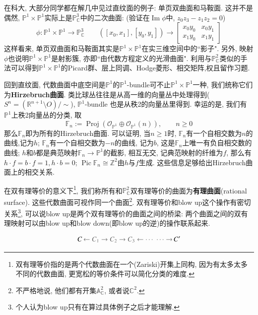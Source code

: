 \documentclass[UTF8,12pt,twoside]{article}
\theoremstyle{definition}
\newcommand{\RR}{\mathbb{R}}  %
\newcommand{\ZZ}{\mathbb{Z}}  %
\newcommand{\CC}{\mathbb{C}}  %
\newcommand{\PCC}{\mathbb{P}_{\CC}^2} %
\newcommand{\PPC}{\mathbb{P}^1 \times \mathbb{P}^1} %
\newcommand{\Img}{\operatorname{Im}}
\newcommand{\Proj}{\operatorname{Proj}}
\newcommand{\Pic}{\operatorname{Pic}}
\numberwithin{equation}{section}
\begin{document}
在科大, 大部分同学都在解几中见过直纹面的例子: 单页双曲面和马鞍面. 这并不是偶然, $\PPC$实际上是$\mathbb{P}_{\CC}^3$中的二次曲面: (验证在$\Img \phi$中, $z_0z_3-z_1z_2=0$)
$$\phi: \PPC \longrightarrow \mathbb{P}_{\CC}^3 \qquad ([x_0,x_1],[y_0,y_1]) \longrightarrow \begin{bmatrix}
x_0y_0 & x_0y_1 \\
x_1y_0 & x_1y_1
\end{bmatrix}$$
这样看来, 单页双曲面和马鞍面其实是$\PPC$在实三维空间中的``影子". 另外, 映射$\phi$也说明$\PPC$是射影簇, 亦即``由代数方程定义的光滑曲面". 利用与$\PCC$类似的手法可以得到$\PPC$的Picard群、层上同调、Hodge菱形、相交矩阵,权且留作习题.

回到直纹面, 代数曲面中底空间是$\mathbb{P}^1$的$\mathbb{P}^1$-bundle可不止$\PPC$一种, 我们统称它们为\textbf{Hirzebruch曲面}. 类比球丛往往是从高一维的向量丛中处理得到($S^n=(\RR^{n+1} \setminus O)/\sim$), $\mathbb{P}^1$-bundle 也是从秩2的向量丛里得到. 幸运的是, 我们有$\mathbb{P}^1$上秩2向量丛的分类, 取
$$\mathbb{F}_n:=\Proj (\mathcal{O}_{\mathbb{P}^1} \oplus \mathcal{O}_{\mathbb{P}^1}(n) ), \qquad n \geqslant 0$$
那么$\mathbb{F}_n$即为所有的Hirzebruch曲面. 可以证明, 当$n \geqslant 1$时, $\mathbb{F}_n$有一个自相交数为$n$的曲线,记为$h$; $\mathbb{F}_n$有一个自相交数为$-n$的曲线, 记为$b$, 这是$\mathbb{F}_n$上唯一有负自相交数的曲线;       $h$和$b$都是典范映射$\mathbb{F}_n \longrightarrow \mathbb{P}^1$的截影, 相互无交, 记典范映射的纤维为$f$, 那么有$h\cdot f= b \cdot f =1, h \cdot b =0$; $\Pic \mathbb{F}_n \cong \ZZ^2$由$h$与$f$生成. 这些信息足够给出Hirzebruch曲面上的相交关系.

在双有理等价的意义下\footnote{双有理等价指的是两个代数曲面在一个(Zariski)开集上同构, 因为有太多太多不同的代数曲面, 更宽松的等价条件可以简化分类的难度.}, 我们称所有和$\PCC$双有理等价的曲面为\textbf{有理曲面}(rational surface). 这些代数曲面可视作同一个曲面\footnote{不严格地说, 他们都有开集$\mathbb{A}_{\CC}^2$, 或者说$\mathbb{C}^2$.}. 双有理等价和blow up这个操作有密切关系\footnote{个人认为blow up只有在算过具体例子之后才能理解.}, 可以说blow up是两个双有理等价的曲面之间的桥梁: 两个曲面之间的双有理映射可以由blow up和blow down(即blow up的逆)的操作联系起来.

$$C\,\textcolor[RGB]{102,102,102}{\leftarrow C_1\rightarrow C_2\rightarrow C_3\leftarrow\cdots\,\,\cdots\rightarrow }\,C'$$
\end{document}
